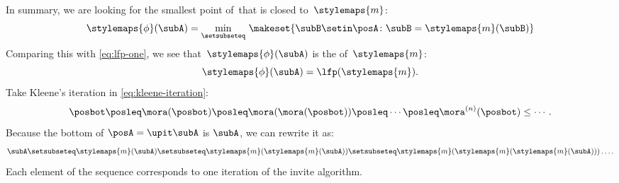 In summary, we are looking for the smallest point of~\posA that is closed to~$\stylemaps{m}$:
%
\begin{equation}
    \stylemaps{\phi}(\subA) = \min_{\setsubseteq}\, \makeset{ \subB \setin \posA \colon \subB = \stylemaps{m}(\subB) }
\end{equation}
Comparing this with \cref{eq:lfp-one}, we see that~$\stylemaps{\phi}(\subA)$ is the  of~$\stylemaps{m}$:
\begin{equation}
    \stylemaps{\phi}(\subA) = \lfp(\stylemaps{m}).
\end{equation}
%
Take Kleene's iteration in \cref{eq:kleene-iteration}:
\begin{equation}
    \posbot\posleq \mora(\posbot)\posleq \mora(\mora(\posbot))\posleq\cdots\posleq \mora^{(n)}(\posbot)\leq\cdots.
\end{equation}
Because the bottom of $\posA = \upit \subA$ is $\subA$, we can rewrite it as:
\begin{equation}
    \subA \setsubseteq \stylemaps{m}(\subA ) \setsubseteq \stylemaps{m}(\stylemaps{m}(\subA)) \setsubseteq \stylemaps{m}(\stylemaps{m}(\stylemaps{m}(\subA))) \ldots .
\end{equation}
Each element of the sequence corresponds to one iteration of the invite algorithm.

